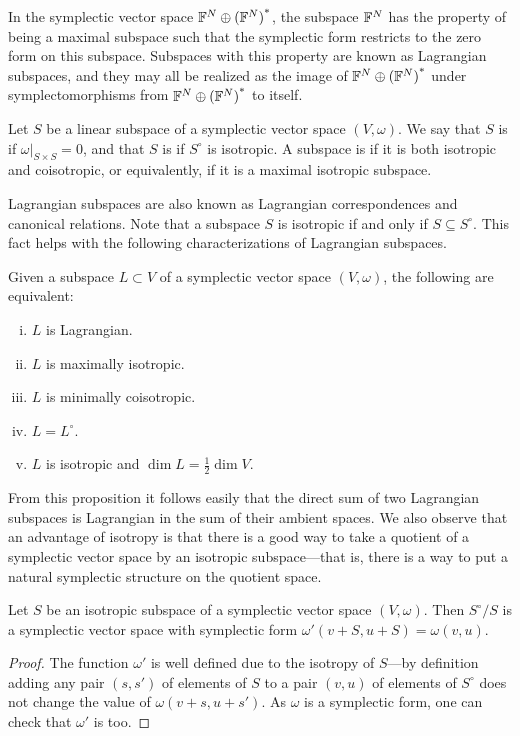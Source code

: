 In the symplectic vector space ${{\mathbb F}^{N} \oplus {({\mathbb F}^{N})}^\ast}$, the subspace ${\mathbb F}^N$ has the
property of being a maximal subspace such that the symplectic form restricts to
the zero form on this subspace. Subspaces with this property are known as Lagrangian
subspaces, and they may all be realized as the image of ${{\mathbb F}^{N} \oplus {({\mathbb F}^{N})}^\ast}$ 
under symplectomorphisms from ${{\mathbb F}^{N} \oplus {({\mathbb F}^{N})}^\ast}$ to itself.

\begin{definition} 
  Let $S$ be a linear subspace of a symplectic vector space $(V,\omega)$. We say
  that $S$ is  if $\omega|_{S \times S} = 0$, and that $S$ is
   if $S^\circ$ is isotropic. A subspace is
   if it is both isotropic and coisotropic, or equivalently, if it  
  is a maximal isotropic subspace.
\end{definition}

Lagrangian subspaces are also known as Lagrangian correspondences and canonical
relations. Note that a subspace $S$ is isotropic if and only if $S \subseteq
S^\circ$. This fact helps with the following characterizations of Lagrangian
subspaces.

\begin{proposition} \label{lagrangian_characterization} 
  Given a subspace $L \subset V$ of a symplectic vector space $(V,\omega)$, the
  following are equivalent: 
  \begin{enumerate}[(i)] 
    \item $L$ is Lagrangian.  
    \item $L$ is maximally isotropic.  
    \item $L$ is minimally coisotropic.  
    \item $L = L^\circ$.  
    \item $L$ is isotropic and $\dim L = \frac12 \dim V$.
  \end{enumerate} 
\end{proposition}

From this proposition it follows easily that the direct sum of two Lagrangian
subspaces is Lagrangian in the sum of their ambient spaces. We also observe that
an advantage of isotropy is that there is a good way to take a quotient of a
symplectic vector space by an isotropic subspace---that is, there is a way to
put a natural symplectic structure on the quotient space.

\begin{proposition}
  Let $S$ be an isotropic subspace of a symplectic vector space $(V,\omega)$.
  Then $S^\circ/S$ is a symplectic vector space with symplectic form
  $\omega'(v+S,u+S) = \omega(v,u)$.
\end{proposition}
\begin{proof} 
  The function $\omega'$ is well defined due to the isotropy of
  $S$---by definition adding any pair $(s,s')$ of elements of $S$ to a pair
  $(v,u)$ of elements of $S^\circ$ does not change the value of
  $\omega(v+s,u+s')$. As $\omega$ is a symplectic form, one can check that
  $\omega'$ is too.  
\end{proof}

